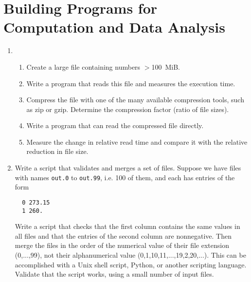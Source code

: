 \documentclass{article}
\begin{document}
\newpage
\section{Building Programs for Computation and Data Analysis}
\begin{enumerate}
  
\item
  \begin{enumerate}\setlength{\itemsep}{0pt}
  \item Create a large file containing numbers $>$100~MiB.
  \item Write a program that reads this file and measures the execution time.
  \item Compress the file with one of the many available compression tools, such as zip or gzip. Determine the compression factor (ratio of file sizes).
  \item Write a program that can read the compressed file directly.
  \item Measure the change in relative read time and compare it with the relative reduction in file size.
  \end{enumerate}
  
\item Write a script that validates and merges a set of files.
  Suppose we have files with names {\tt out.0} to {\tt out.99}, i.e. 100 of them, and each has entries of the form
\begin{verbatim}
  0 273.15
  1 260.
\end{verbatim}
Write a script that checks that the first column contains the same values in all files and that the entries of the second column are nonnegative. Then merge the files in the order of the numerical value of their file extension (0,...,99), not their alphanumerical value (0,1,10,11,...,19,2,20,...). This can be accomplished with a Unix shell script, Python, or another scripting language. Validate that the script works, using a small number of input files.

\end{enumerate}




\newpage
\end{document}
